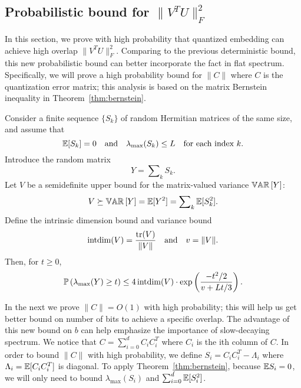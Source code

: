 \documentclass[12pt]{article}
\begin{document}
\subsection{Probabilistic bound for $\|V^T U\|_F^2$}
\label{subsec:prob_overlap}

In this section, we prove with high probability that quantized embedding can achieve high overlap $\|V^T U\|_F^2$. Comparing to the previous deterministic bound, this new probabilistic bound can better incorporate the fact in flat spectrum. Specifically, we will prove a high probability bound for $\|C\|$ where $C$ is the quantization error matrix; this analysis is based on the matrix Bernstein inequality in Theorem~\ref{thm:bernstein}.

\begin{theorem} \label{thm:intdim-bernstein-herm}
Consider a finite sequence $\{ S_k \}$ of random Hermitian matrices of the same size,
and assume that
\begin{equation*}
  \E [S_k] = 0
  \quad\text{and}\quad
  \lambda_{\max}(S_k) \leq L
  \quad\text{for each index $k$.}
\end{equation*}
Introduce the random matrix
\begin{equation*}
  Y = \sum\nolimits_k S_k.
\end{equation*}
Let $V$ be a semidefinite upper bound for the matrix-valued variance $\var{}{Y}$:
\begin{equation*}
  V \succeq \var{}{Y} = \E [Y^2] = \sum\nolimits_k \E [S_k^2].
\end{equation*}
Define the intrinsic dimension bound and variance bound
\begin{equation*}
  \operatorname{intdim}(V) = \frac{\tr(V)}{\norm{V}}
  \quad\text{and}\quad
  v = \norm{V}.
\end{equation*}
Then, for $t \geq 0$,
\begin{equation} \label{eqn:intdim-bernstein-tail}
\Prob \left( \lambda_{\max}(Y) \geq t \right)
	\leq 4 \operatorname{intdim}(V) \cdot \exp\left( \frac{-t^2/2}{v + Lt/3} \right).
\end{equation}
\label{thm:bernstein}
\end{theorem}

In the next we prove $\| C \| = O(1)$ with high probability; this will help us get better bound on number of bits to achieve a specific overlap. The advantage of this new bound on $b$ can help emphasize the importance of slow-decaying spectrum. 
	We notice that $C=\sum^d_{i=0}C_iC^T_i$ where $C_i$ is the ith column of $C$. In order to bound $\|C\|$ with high probability, we define $S_i = C_iC^T_i - \Lambda_i$ where $\Lambda_i = \E [C_iC^T_i]$ is diagonal. To apply Theorem~\ref{thm:bernstein}, because $\E S_i = 0$, we will only need to bound $\lambda_{\max}(S_i)$ and $\sum_{i=0}^d \E[S^2_i]$.
	
\end{document}
